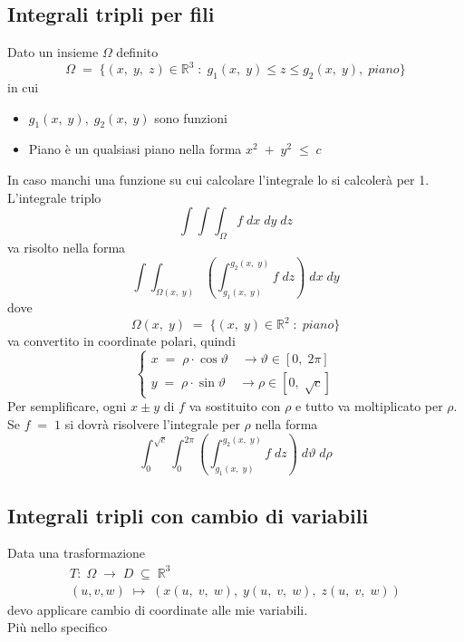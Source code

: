 \documentclass[a4paper, 10pt]{article}
\begin{document}
 			\subsection{Integrali tripli per fili}
 				Dato un insieme $ \Omega $ definito
 					\[
 						\Omega\; =\; \{ (x,\; y,\; z) \in \mathbb{R}^3\; :\; g_1(x,\; y) \leq z \leq g_2(x,\; y),\; piano \}
 					\]
 				in cui
 					\begin{itemize}
 						\item $ g_1(x,\; y),\; g_2(x,\; y) $ sono funzioni
 						\item Piano è un qualsiasi piano nella forma $ x^2\; +\; y^2\; \leq\; c $
  					\end{itemize}
  				In caso manchi una funzione su cui calcolare l'integrale lo si calcolerà per 1.\\
  				L'integrale triplo
  					\[
  					\int{\int{\int_{\Omega}{f}}}\; dx\;dy\;dz
  					\]
  				va risolto nella forma
  					\[
	  					\int{\int_{\Omega(x,\; y)}^{ }{\left( \int_{g_1(x,\; y)}^{g_2(x,\; y)}{f}\; dz \right)}}\; dx\; dy
  					\]
  				dove
  					\[
  						\Omega(x,\; y)\; =\; \{ (x,\; y) \in \mathbb{R}^2\; :\; piano \}
  					\]
  				va convertito in coordinate polari, quindi
  					\[
	  					\begin{cases} 
		  					x\; =\; \rho \cdot \cos{\vartheta}\quad \rightarrow \vartheta \in [0,\; 2\pi] \\ 
		  					y\; =\; \rho \cdot \sin{\vartheta}\quad \rightarrow \rho \in [0,\; \sqrt{c}]
	  					\end{cases} 
  					\]
  				Per semplificare, ogni $ x \pm y $ di $ f $ va sostituito con $ \rho $ e tutto va moltiplicato per $ \rho $.\\
  				Se $ f\; =\; 1 $ si dovrà risolvere l'integrale per $ \rho $ nella forma
  					\[
  						\int_{0}^{\sqrt{c}}{\int_{0}^{2\pi}{\left( \int_{g_1(x,\; y)}^{g_2(x,\; y)}{f}\; dz \right)}}\; d\vartheta\; d\rho
  					\]
  					
  			\subsection{Integrali tripli con cambio di variabili}
  				Data una trasformazione
  					\[
  						\begin{array}{c}
	  						T:\; \Omega\; \rightarrow\; D\; \subseteq\; \mathbb{R}^3 \\
	  						(u, v, w)\; \mapsto\; (x(u,\; v,\; w),\; y(u,\; v,\; w),\; z(u,\; v,\; w))
  						\end{array}	  					
  					\]
  				devo applicare cambio di coordinate alle mie variabili.\\
  				Più nello specifico
  				
\end{document}
